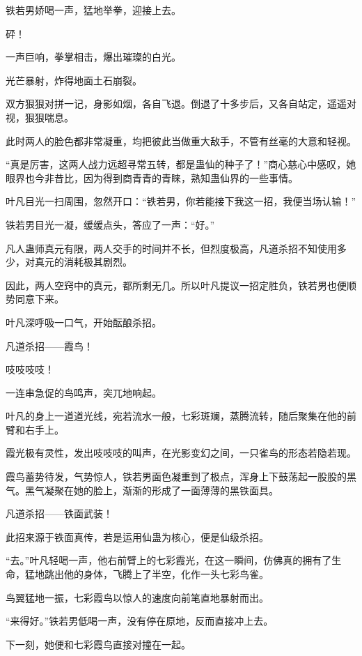 
\begin{this_body}

铁若男娇喝一声，猛地举拳，迎接上去。

砰！

一声巨响，拳掌相击，爆出璀璨的白光。

光芒暴射，炸得地面土石崩裂。

双方狠狠对拼一记，身影如烟，各自飞退。倒退了十多步后，又各自站定，遥遥对视，狠狠喘息。

此时两人的脸色都非常凝重，均把彼此当做重大敌手，不管有丝毫的大意和轻视。

“真是厉害，这两人战力远超寻常五转，都是蛊仙的种子了！”商心慈心中感叹，她眼界也今非昔比，因为得到商青青的青睐，熟知蛊仙界的一些事情。

叶凡目光一扫周围，忽然开口：“铁若男，你若能接下我这一招，我便当场认输！”

铁若男目光一凝，缓缓点头，答应了一声：“好。”

凡人蛊师真元有限，两人交手的时间并不长，但烈度极高，凡道杀招不知使用多少，对真元的消耗极其剧烈。

因此，两人空窍中的真元，都所剩无几。所以叶凡提议一招定胜负，铁若男也便顺势同意下来。

叶凡深呼吸一口气，开始酝酿杀招。

凡道杀招——霞鸟！

吱吱吱吱！

一连串急促的鸟鸣声，突兀地响起。

叶凡的身上一道道光线，宛若流水一般，七彩斑斓，蒸腾流转，随后聚集在他的前臂和右手上。

霞光极有灵性，发出吱吱吱的叫声，在光影变幻之间，一只雀鸟的形态若隐若现。

霞鸟蓄势待发，气势惊人，铁若男面色凝重到了极点，浑身上下鼓荡起一股股的黑气。黑气凝聚在她的脸上，渐渐的形成了一面薄薄的黑铁面具。

凡道杀招——铁面武装！

此招来源于铁面真传，若是运用仙蛊为核心，便是仙级杀招。

“去。”叶凡轻喝一声，他右前臂上的七彩霞光，在这一瞬间，仿佛真的拥有了生命，猛地跳出他的身体，飞腾上了半空，化作一头七彩鸟雀。

鸟翼猛地一振，七彩霞鸟以惊人的速度向前笔直地暴射而出。

“来得好。”铁若男低喝一声，没有停在原地，反而直接冲上去。

下一刻，她便和七彩霞鸟直接对撞在一起。


\end{this_body}

